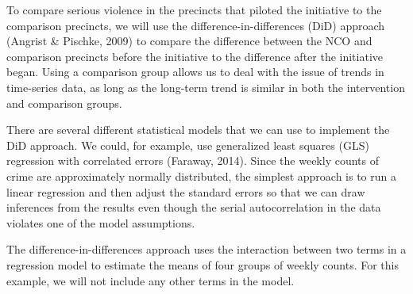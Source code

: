 \documentclass[
  english,
  man,a4paper,mask,floatsintext]{apa6}
\newenvironment{Shaded}{\begin{snugshade}}{\end{snugshade}}
\newcommand{\CommentTok}[1]{\textcolor[rgb]{0.56,0.35,0.01}{\textit{#1}}}
\newcommand{\DataTypeTok}[1]{\textcolor[rgb]{0.13,0.29,0.53}{#1}}
\newcommand{\KeywordTok}[1]{\textcolor[rgb]{0.13,0.29,0.53}{\textbf{#1}}}
\newcommand{\NormalTok}[1]{#1}
\newcommand{\OperatorTok}[1]{\textcolor[rgb]{0.81,0.36,0.00}{\textbf{#1}}}
\newcommand{\OtherTok}[1]{\textcolor[rgb]{0.56,0.35,0.01}{#1}}
\newcommand{\StringTok}[1]{\textcolor[rgb]{0.31,0.60,0.02}{#1}}
\begin{document}
\normalsize

To compare serious violence in the precincts that piloted the initiative to the comparison precincts, we will use the difference-in-differences (DiD) approach (Angrist \& Pischke, 2009) to compare the difference between the NCO and comparison precincts before the initiative to the difference after the initiative began. Using a comparison group allows us to deal with the issue of trends in time-series data, as long as the long-term trend is similar in both the intervention and comparison groups.

There are several different statistical models that we can use to implement the DiD approach. We could, for example, use generalized least squares (GLS) regression with correlated errors (Faraway, 2014). Since the weekly counts of crime are approximately normally distributed, the simplest approach is to run a linear regression and then adjust the standard errors so that we can draw inferences from the results even though the serial autocorrelation in the data violates one of the model assumptions.

The difference-in-differences approach uses the interaction between two terms in a regression model to estimate the means of four groups of weekly counts. For this example, we will not include any other terms in the model.

\footnotesize

\begin{Shaded}
\end{Shaded}
\end{document}
